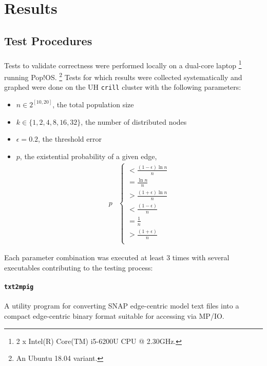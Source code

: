 \documentclass[11pt,epsf]{article}
\begin{document}
\section{Results}{
  \subsection{Test Procedures}{
    \paragraph{}{
      Tests to validate correctness were performed locally on a dual-core laptop
      \footnote{2 x Intel(R) Core(TM) i5-6200U CPU @ 2.30GHz.} running Pop!OS.
      \footnote{An Ubuntu 18.04 variant.}
      Tests for which results were collected systematically and graphed were
      done on the UH \texttt{crill} cluster with the following parameters:
      \begin{itemize}
      \item{$n \in 2^{[10,20]}$, the total population size}
      \item{$k \in \{1,2,4,8,16,32\}$, the number of distributed nodes}
      \item{$\epsilon = 0.2$, the threshold error}
      \item{$p$, the existential probability of a given edge,
        \begin{align}
          p &
          \begin{cases}
            < \frac{(1 - \epsilon)\ln n}{n} \\
            = \frac{\ln n}{n} \\
            > \frac{(1 + \epsilon)\ln n}{n} \\
            < \frac{(1 - \epsilon)}{n} \\
            = \frac{1}{n} \\
            > \frac{(1 + \epsilon)}{n} \\
          \end{cases}
        \end{align}
      }
      \end{itemize}
      Each parameter combination was executed at least 3 times with
      several executables contributing to the testing process:
    }
    \paragraph{\texttt{txt2mpig}}{
      A utility program for converting SNAP edge-centric model text files
      into a compact edge-centric binary format suitable for accessing via MP/IO.
    }
}}
\end{document}
